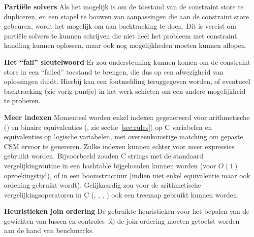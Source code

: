 {\bf Parti\"ele solvers} Als het mogelijk is om de toestand van de constraint store te dupliceren, en een stapel te bouwen van aanpassingen die aan de constraint store gebeuren, wordt het mogelijk om aan backtracking te doen. Dit is vereist om parti\"ele solvers te kunnen schrijven die niet heel het probleem met constraint handling kunnen oplossen, maar ook nog mogelijkheden moeten kunnen aflopen.

{\bf Het ``fail'' sleutelwoord} Er zou ondersteuning kunnen komen om de constraint store in een ``failed'' toestand te brengen, die dus op een afwezigheid van oplossingen duidt. Hierbij kan een foutmelding teruggegeven worden, of eventueel backtracking (zie vorig puntje) in het werk schieten om een andere mogelijkheid te proberen.

{\bf Meer indexen} Momenteel worden enkel indexen gegenereerd voor arithmetische (\code{==}) en binaire equivalenties (, zie sectie~\ref{sec:rules}) op C variabelen en equivalenties op logische variabelen, met overeenkomstige matching om gepaste CSM ervoor te genereren. Zulke indexen kunnen echter voor meer expressies gebruikt worden. Bijvoorbeeld zouden C strings met de standaard vergelijkingroutine  in een hashtable bijgehouden kunnen worden (voor $O(1)$ opzoekingstijd), of in een boomstructuur (indien niet enkel equivalentie maar ook ordening gebruikt wordt). Gelijkaardig zou voor de arithmetische vergelijkingsoperatoren in C (\code{>}, \code{<}, \code{>=}, \code{<=}) ook een treemap gebruikt kunnen worden.

{\bf Heuristieken join ordering} De gebruikte heuristieken voor het bepalen van de gewichten van lussen en controles bij de join ordering moeten getoetst worden aan de hand van benchmarks.
